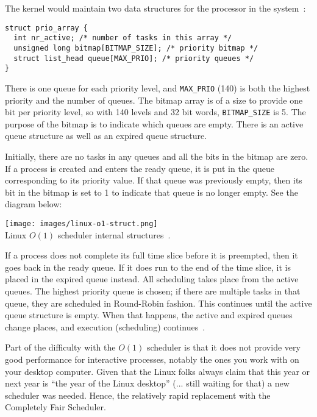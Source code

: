 The kernel would maintain two data structures for the processor in the system~\cite{osi}:

\begin{verbatim}
struct prio_array {
  int nr_active; /* number of tasks in this array */
  unsigned long bitmap[BITMAP_SIZE]; /* priority bitmap */
  struct list_head queue[MAX_PRIO]; /* priority queues */
}
\end{verbatim}

There is one queue for each priority level, and \texttt{MAX\_PRIO} (140) is both the highest priority and the number of queues. The bitmap array is of a size to provide one bit per priority level, so with 140 levels and 32 bit words, \texttt{BITMAP\_SIZE} is 5. The purpose of the bitmap is to indicate which queues are empty. There is an active queue structure as well as an expired queue structure.

Initially, there are no tasks in any queues and all the bits in the bitmap are zero. If a process is created and enters the ready queue, it is put in the queue corresponding to its priority value. If that queue was previously empty, then its bit in the bitmap is set to 1 to indicate that queue is no longer empty. See the diagram below:

\begin{center}
	\texttt{[image: images/linux-o1-struct.png]}\\
	Linux $O(1)$ scheduler internal structures~\cite{osi}.
\end{center}

If a process does not complete its full time slice before it is preempted, then it goes back in the ready queue. If it does run to the end of the time slice, it is placed in the expired queue instead. All scheduling takes place from the active queues. The highest priority queue is chosen; if there are multiple tasks in that queue, they are scheduled in Round-Robin fashion. This continues until the active queue structure is empty. When that happens, the active and expired queues change places, and execution (scheduling) continues~\cite{osi}.

Part of the difficulty with the $O(1)$ scheduler is that it does not provide very good performance for interactive processes, notably the ones you work with on your desktop computer. Given that the Linux folks always claim that this year or next year is ``the year of the Linux desktop'' (... still waiting for that) a new scheduler was needed. Hence, the relatively rapid replacement with the Completely Fair Scheduler.

